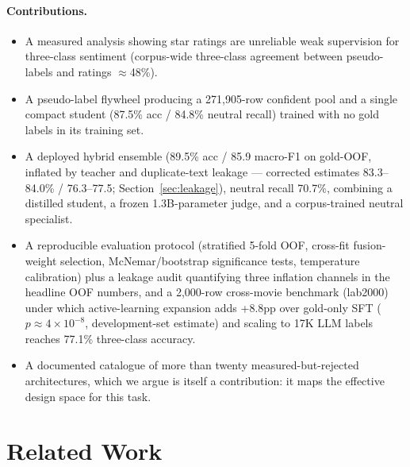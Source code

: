 \documentclass[11pt,a4paper]{article}
\begin{document}
\paragraph{Contributions.}
\begin{itemize}
  \item A measured analysis showing star ratings are unreliable weak
        supervision for three-class sentiment (corpus-wide three-class
        agreement between pseudo-labels and ratings $\approx$48\%).
  \item A pseudo-label flywheel producing a 271{,}905-row confident pool
        and a single compact student (87.5\% acc / 84.8\% neutral recall)
        trained with no gold labels in its training set.
  \item A deployed hybrid ensemble (89.5\% acc / 85.9 macro-F1 on
        gold-OOF, inflated by teacher and duplicate-text leakage ---
        corrected estimates
        83.3--84.0\% / 76.3--77.5; Section~\ref{sec:leakage}),
        neutral recall 70.7\%, combining a distilled student, a frozen
        1.3B-parameter judge, and a corpus-trained neutral specialist.
  \item A reproducible evaluation protocol (stratified 5-fold OOF,
        cross-fit fusion-weight selection, McNemar/bootstrap
        significance tests, temperature calibration) plus a leakage
        audit quantifying three inflation channels in the headline OOF
        numbers, and a 2{,}000-row cross-movie benchmark (lab2000)
        under which active-learning expansion adds +8.8pp over
        gold-only SFT ($p \approx 4\times10^{-8}$, development-set
        estimate) and scaling to 17K LLM labels reaches 77.1\%
        three-class accuracy.
  \item A documented catalogue of more than twenty measured-but-rejected
        architectures, which we argue is itself a contribution: it maps
        the effective design space for this task.
\end{itemize}

\section{Related Work}
\label{sec:related}
\end{document}
